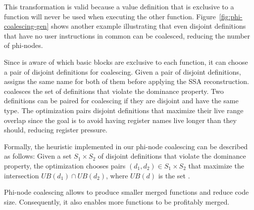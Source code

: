 This transformation is valid because a value definition that
is exclusive to a function will never be used when executing
the other function.
Figure~\ref{fig:phi-coalescing-gen} shows another example
illustrating that even disjoint definitions that have no user instructions
in common can be coalesced, reducing the number of phi-nodes.

Since {\ProjName} is aware of which basic blocks are exclusive to each function, it can choose a pair of disjoint definitions for
coalescing. Given a pair of disjoint definitions, {\ProjName} assigns the same name for both of them before applying the SSA
reconstruction. {\ProjName} coalesces the set of definitions that violate the dominance property. Two definitions can be paired for
coalescing if they are disjoint and have the same type. The optimization pairs disjoint definitions that maximize their live range overlap
since the goal is to avoid having register names live longer than they should, reducing register pressure.

Formally, the heuristic implemented in our phi-node coalescing can be described as follows:
Given a set $S_1\times S_2$ of disjoint definitions that violate the dominance property,
the optimization chooses pairs $(d_1,d_2)\in S_1\times S_2$ that maximize the intersection $U\!B(d_1)\cap U\!B(d_2)$,
where $U\!B(d)$ is the set .

Phi-node coalescing allows {\ProjName} to produce smaller merged functions and reduce code size.
Consequently, it also enables more functions to be profitably merged.
